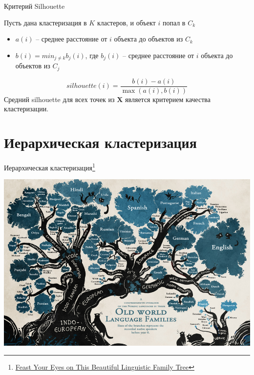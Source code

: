 \documentclass[aspectratio=169]{beamer}
\begin{document}
\begin{frame}{Критерий Silhouette}

Пусть дана кластеризация в $K$ кластеров, и объект $i$ попал в $C_k$

\vspace{1em}
\begin{itemize}
\item $a(i)$ -- среднее расстояние от $i$ объекта до объектов из $C_k$
\item $b(i) = min_{j \neq k} b_j(i)$,  где $b_j(i)$ -- среднее расстояние от $i$ объекта до объектов из $C_j$
\end{itemize}
\[
silhouette(i) = \frac{b(i) - a(i)}{\max(a(i), b(i))}
\]
Средний silhouette для всех точек из $\mathbf{X}$ является критерием качества кластеризации.

\end{frame}


\section{Иерархическая кластеризация}


\begin{frame}

\begin{center}
{\Large Иерархическая кластеризация\footnote{\href{http://mentalfloss.com/article/59665/feast-your-eyes-beautiful-linguistic-family-tree}{Feast Your Eyes on This Beautiful Linguistic Family Tree}}}

\vspace{1em}
\includegraphics[width=0.95\textheight]{images/languages.png}
\end{center}

\end{frame}
\end{document}
